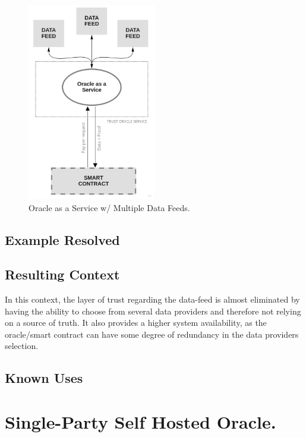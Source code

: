 \begin{figure}[t]
  \begin{center}
    \leavevmode
    \includegraphics[width=0.5\textwidth]{figures/oraclearch2.jpg}
    \caption{Oracle as a Service w/ Multiple Data Feeds.}
    \label{fig:/figures/OaaSwMultipleDataFeed}
  \end{center}
\end{figure}

\subsection{Example Resolved}

\subsection{Resulting Context}
In this context, the layer of trust regarding the data-feed is almost eliminated by having the ability to choose from several data providers and therefore not relying on a source of truth. It also provides a higher system availability, as the oracle/smart contract can have some degree of redundancy in the data providers selection.

\subsection{Known Uses}

\section{Single-Party Self Hosted Oracle.}\label{SPSelfHostedOracle}

